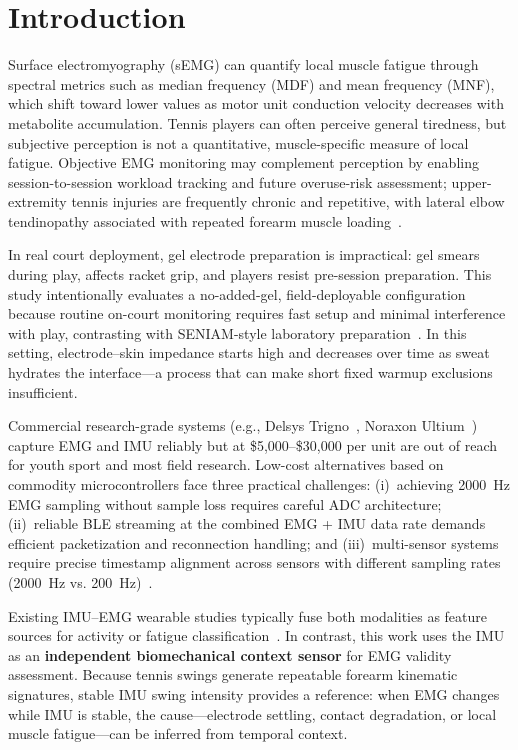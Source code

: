 \documentclass[sensors,article,submit,pdftex,moreauthors]{Definitions/mdpi}
\begin{document}

\section{Introduction}
\label{sec:intro}

Surface electromyography (sEMG) can quantify local muscle fatigue through spectral
metrics such as median frequency (MDF) and mean frequency (MNF), which shift toward
lower values as motor unit conduction velocity decreases with metabolite accumulation.
Tennis players can often perceive general tiredness, but subjective perception is not a
quantitative, muscle-specific measure of local fatigue. Objective EMG monitoring may
complement perception by enabling session-to-session workload tracking and future
overuse-risk assessment; upper-extremity tennis injuries are frequently chronic and
repetitive, with lateral elbow tendinopathy associated with repeated forearm muscle
loading~\cite{aaos2023}.

In real court deployment, gel electrode preparation is impractical: gel smears during
play, affects racket grip, and players resist pre-session preparation. This study
intentionally evaluates a no-added-gel, field-deployable configuration because routine
on-court monitoring requires fast setup and minimal interference with play, contrasting
with SENIAM-style laboratory preparation~\cite{hermens2000}. In this setting,
electrode--skin impedance starts high and decreases over time as sweat hydrates the
interface---a process that can make short fixed warmup exclusions insufficient.

Commercial research-grade systems (e.g., Delsys Trigno~\cite{delsys2024}, Noraxon
Ultium~\cite{noraxon2024}) capture EMG and IMU reliably but at \$5{,}000--\$30{,}000
per unit are out of reach for youth sport and most field research. Low-cost alternatives
based on commodity microcontrollers face three practical challenges: (i)~achieving
2000~Hz EMG sampling without sample loss requires careful ADC architecture;
(ii)~reliable BLE streaming at the combined EMG + IMU data rate demands efficient
packetization and reconnection handling; and (iii)~multi-sensor systems require precise
timestamp alignment across sensors with different sampling rates
(2000~Hz vs. 200~Hz)~\cite{cerone2019,lynn2018,yang2024}.

Existing IMU--EMG wearable studies typically fuse both modalities as feature sources for
activity or fatigue classification~\cite{taborri2020,bangaru2022}. In contrast, this
work uses the IMU as an \textbf{independent biomechanical context sensor} for EMG
validity assessment. Because tennis swings generate repeatable forearm kinematic
signatures, stable IMU swing intensity provides a reference: when EMG changes while
IMU is stable, the cause---electrode settling, contact degradation, or local muscle
fatigue---can be inferred from temporal context.
\end{document}
